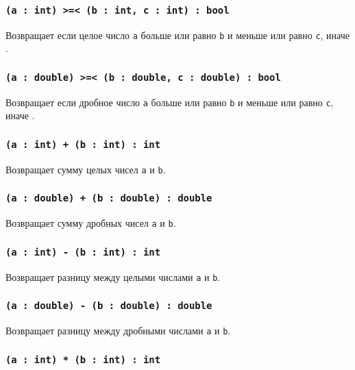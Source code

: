 \subsubsection{\texttt{(a : int) >=< (b : int, c : int) : bool}}

Возвращает \true{} если целое число \texttt{a} больше или равно \texttt{b} и меньше или равно \texttt{c}, иначе \false{}.

\subsubsection{\texttt{(a : double) >=< (b : double, c : double) : bool}}

Возвращает \true{} если дробное число \texttt{a} больше или равно \texttt{b} и меньше или равно \texttt{c}, иначе \false{}.


\subsubsection{\texttt{(a : int) + (b : int) : int}}

Возвращает сумму целых чисел \texttt{a} и \texttt{b}.

\subsubsection{\texttt{(a : double) + (b : double) : double}}

Возвращает сумму дробных чисел \texttt{a} и \texttt{b}.

\subsubsection{\texttt{(a : int) - (b : int) : int}}

Возвращает разницу между целыми числами \texttt{a} и \texttt{b}.

\subsubsection{\texttt{(a : double) - (b : double) : double}}

Возвращает разницу между дробными числами \texttt{a} и \texttt{b}.

\subsubsection{\texttt{(a : int) * (b : int) : int}}

